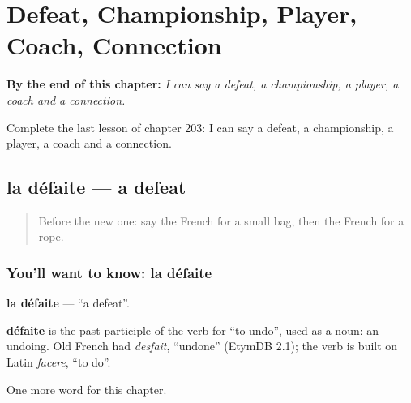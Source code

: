 
\chapter{Defeat, Championship, Player, Coach, Connection}
\label{ch:fr-defeat-championship-player-coach-connection}

\begin{chapteropening}
\textbf{By the end of this chapter:} \emph{I can say a defeat, a championship, a player, a coach and a connection.}

Complete the last lesson of chapter 203: I can say a defeat, a championship, a player, a coach and a connection.
\end{chapteropening}

\section[la défaite]{la défaite — a defeat}

\label{lesson:FR-C203-defaite}



\begin{quote}
Before the new one: say the French for a small bag, then the French for a rope.
\end{quote}

\subsection*{You'll want to know: la défaite}
\textbf{la défaite} — \textquotedblleft{}a defeat\textquotedblright{}.

\begin{cousinweb}
\textbf{défaite} is the past participle of the verb for \textquotedblleft{}to undo\textquotedblright{}, used as a noun: an undoing. Old French had \emph{desfait}, \textquotedblleft{}undone\textquotedblright{} (EtymDB 2.1); the verb is built on Latin \emph{facere}, \textquotedblleft{}to do\textquotedblright{}.
\end{cousinweb}

\begin{grammarlens}[title={What you've built}]
One more word for this chapter.
\end{grammarlens}


